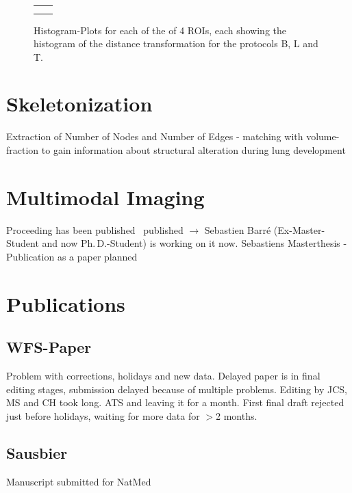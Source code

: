 \documentclass[a4paper,twoside,english,DIV=calc]{scrartcl}
\newcommand{\imsize}{\linewidth}
\begin{document}
\renewcommand{\imsize}{.309\columnwidth}
\begin{figure}[htp]
	\centering
	\begin{tabular}{cc}
		&%
		\\%
		&%
	\end{tabular}
	\caption{Histogram-Plots for each of the of 4 ROIs, each showing the histogram of the distance transformation for the protocols B, L and T.}%
	\label{fig:DTFplots}
\end{figure}

\section{Skeletonization}
Extraction of Number of Nodes and Number of Edges - matching with volume-fraction to gain information about structural alteration during lung development

\section{Multimodal Imaging}
Proceeding has been published~\cite{Haberthuer2009} published $\rightarrow$ Sebastien Barré (Ex-Master-Student and now Ph.\,D.-Student) is working on it now. Sebastiens Masterthesis - Publication as a paper planned

\section{Publications}\label{sec:publications}
\subsection{WFS-Paper}
Problem with corrections, holidays and new data. Delayed paper is in final editing stages, submission delayed because of multiple problems. Editing by JCS, MS and CH took long. ATS and leaving it for a month. First final draft rejected just before holidays, waiting for more data for $>$2 months.

\subsection{Sausbier}
Manuscript submitted for NatMed\cite{Sausbier2009b}



\end{document}
